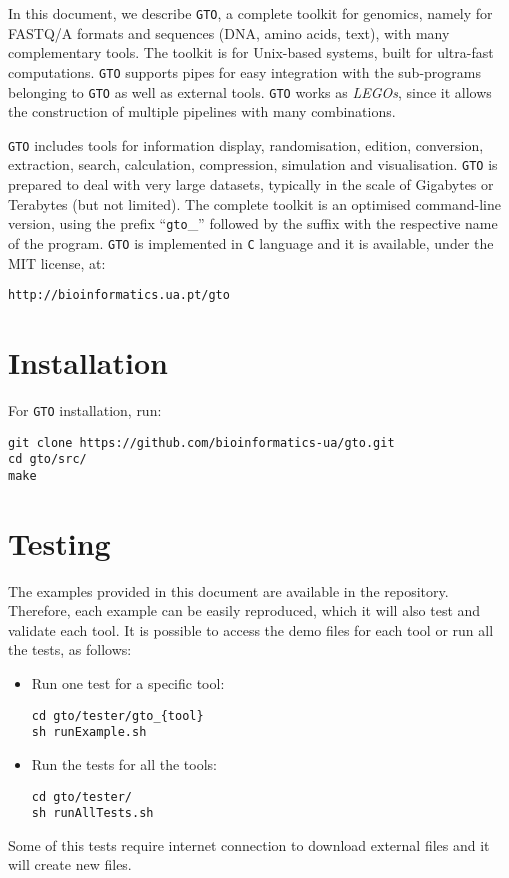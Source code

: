 In this document, we describe \texttt{GTO}, a complete toolkit for genomics, namely for FASTQ/A formats and sequences (DNA, amino acids, text), with many complementary tools. The toolkit is for Unix-based systems, built for ultra-fast computations. \texttt{GTO} supports pipes for easy integration with the sub-programs belonging to \texttt{GTO} as well as external tools. \texttt{GTO} works as \textit{LEGOs}, since it allows the construction of multiple pipelines with many combinations.

\texttt{GTO} includes tools for information display, randomisation, edition, conversion, extraction, search, calculation, compression, simulation and visualisation. \texttt{GTO} is prepared to deal with very large datasets, typically in the scale of Gigabytes or Terabytes (but not limited).
The complete toolkit is an optimised command-line version, using the prefix ``\texttt{gto}\_'' followed by the suffix with the respective name of the program. \texttt{GTO} is implemented in \texttt{C} language and it is available, under the MIT license, at:
\begin{lstlisting}
http://bioinformatics.ua.pt/gto
\end{lstlisting}

\section{Installation}

For \texttt{GTO} installation, run:
\begin{lstlisting}
git clone https://github.com/bioinformatics-ua/gto.git
cd gto/src/
make
\end{lstlisting}

\section{Testing}
The examples provided in this document are available in the repository. Therefore, each example can be easily reproduced, which it will also test and validate each tool. It is possible to access the demo files for each tool or run all the tests, as follows:
\begin{itemize}
	\item Run one test for a specific tool:
\begin{lstlisting}
cd gto/tester/gto_{tool}
sh runExample.sh
\end{lstlisting}
\item Run the tests for all the tools:
\begin{lstlisting}
cd gto/tester/
sh runAllTests.sh
\end{lstlisting}
\end{itemize}
Some of this tests require internet connection to download external files and it will create new files.

